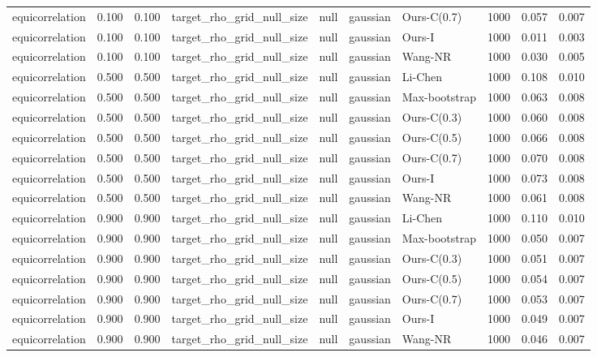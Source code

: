 \begin{tabular}{lrrllllrrr}
equicorrelation & 0.100 & 0.100 & target\_rho\_grid\_null\_size & null & gaussian & Ours-C(0.7) & 1000 & 0.057 & 0.007 \\
equicorrelation & 0.100 & 0.100 & target\_rho\_grid\_null\_size & null & gaussian & Ours-I & 1000 & 0.011 & 0.003 \\
equicorrelation & 0.100 & 0.100 & target\_rho\_grid\_null\_size & null & gaussian & Wang-NR & 1000 & 0.030 & 0.005 \\
equicorrelation & 0.500 & 0.500 & target\_rho\_grid\_null\_size & null & gaussian & Li-Chen & 1000 & 0.108 & 0.010 \\
equicorrelation & 0.500 & 0.500 & target\_rho\_grid\_null\_size & null & gaussian & Max-bootstrap & 1000 & 0.063 & 0.008 \\
equicorrelation & 0.500 & 0.500 & target\_rho\_grid\_null\_size & null & gaussian & Ours-C(0.3) & 1000 & 0.060 & 0.008 \\
equicorrelation & 0.500 & 0.500 & target\_rho\_grid\_null\_size & null & gaussian & Ours-C(0.5) & 1000 & 0.066 & 0.008 \\
equicorrelation & 0.500 & 0.500 & target\_rho\_grid\_null\_size & null & gaussian & Ours-C(0.7) & 1000 & 0.070 & 0.008 \\
equicorrelation & 0.500 & 0.500 & target\_rho\_grid\_null\_size & null & gaussian & Ours-I & 1000 & 0.073 & 0.008 \\
equicorrelation & 0.500 & 0.500 & target\_rho\_grid\_null\_size & null & gaussian & Wang-NR & 1000 & 0.061 & 0.008 \\
equicorrelation & 0.900 & 0.900 & target\_rho\_grid\_null\_size & null & gaussian & Li-Chen & 1000 & 0.110 & 0.010 \\
equicorrelation & 0.900 & 0.900 & target\_rho\_grid\_null\_size & null & gaussian & Max-bootstrap & 1000 & 0.050 & 0.007 \\
equicorrelation & 0.900 & 0.900 & target\_rho\_grid\_null\_size & null & gaussian & Ours-C(0.3) & 1000 & 0.051 & 0.007 \\
equicorrelation & 0.900 & 0.900 & target\_rho\_grid\_null\_size & null & gaussian & Ours-C(0.5) & 1000 & 0.054 & 0.007 \\
equicorrelation & 0.900 & 0.900 & target\_rho\_grid\_null\_size & null & gaussian & Ours-C(0.7) & 1000 & 0.053 & 0.007 \\
equicorrelation & 0.900 & 0.900 & target\_rho\_grid\_null\_size & null & gaussian & Ours-I & 1000 & 0.049 & 0.007 \\
equicorrelation & 0.900 & 0.900 & target\_rho\_grid\_null\_size & null & gaussian & Wang-NR & 1000 & 0.046 & 0.007 \\

\end{tabular}
